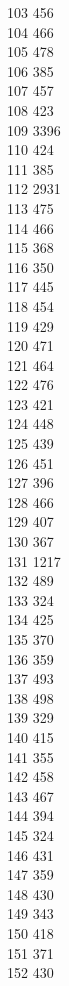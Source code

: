 { 103	456 \\
 104	466 \\
 105	478 \\
 106	385 \\
 107	457 \\
 108	423 \\
 109	3396 \\
 110	424 \\
 111	385 \\
 112	2931 \\
 113	475 \\
 114	466 \\
 115	368 \\
 116	350 \\
 117	445 \\
 118	454 \\
 119	429 \\
 120	471 \\
 121	464 \\
 122	476 \\
 123	421 \\
 124	448 \\
 125	439 \\
 126	451 \\
 127	396 \\
 128	466 \\
 129	407 \\
 130	367 \\
 131	1217 \\
 132	489 \\
 133	324 \\
 134	425 \\
 135	370 \\
 136	359 \\
 137	493 \\
 138	498 \\
 139	329 \\
 140	415 \\
 141	355 \\
 142	458 \\
 143	467 \\
 144	394 \\
 145	324 \\
 146	431 \\
 147	359 \\
 148	430 \\
 149	343 \\
 150	418 \\
 151	371 \\
 152	430 \\
}
